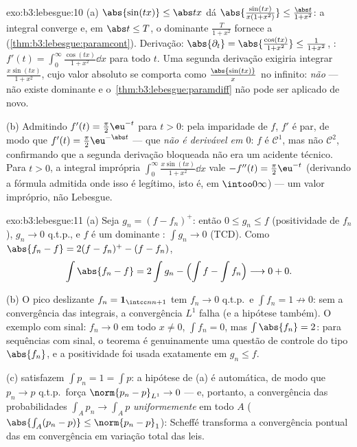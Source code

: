 \begin{solution}{exo:b3:lebesgue:10}
(a) $\abs{\sin(tx)} \leq \abs tx$ dá
$\abs{\frac{\sin(tx)}{x(1+x^2)}} \leq \frac{\abs
t}{1+x^2}$: a integral converge e, em $\abs t \leq T$, o
dominante $\frac{T}{1+x^2}$ fornece a 
(\cref{thm:b3:lebesgue:paramcont}). Derivação:
$\abs{\partial_t} = \abs{\frac{\cos(tx)}{1+x^2}} \leq
\frac1{1+x^2}$, : $f'(t) =
\int_0^\infty\frac{\cos(tx)}{1+x^2}\dd x$ para todo $t$. Uma segunda
derivação exigiria integrar $\frac{x\sin(tx)}{1 +
x^2}$, cujo valor absoluto se comporta como $\frac{\abs{\sin(tx)}}
x$ no infinito: \emph{não}  --- não existe dominante
e o~\cref{thm:b3:lebesgue:paramdiff} não pode ser aplicado de novo.

(b) Admitindo $f'(t) = \frac\pi2\eu^{-t}$ para $t > 0$: pela
imparidade de $f$, $f'$ é par, de modo que $f'(t) =
\frac\pi2\eu^{-\abs t}$ --- que \emph{não é derivável
em $0$}: $f$ é $\mathcal C^1$, mas não $\mathcal C^2$,
confirmando que a segunda derivação bloqueada não era um
acidente técnico. Para $t > 0$, a integral imprópria
$\int_0^\infty\frac{x\sin(tx)}{1+x^2}\dd x$ vale $-f''(t) =
\frac\pi2\eu^{-t}$ (derivando a fórmula admitida onde
isso é legítimo, isto é, em $\intoo0\infty$) --- um valor
impróprio, não Lebesgue.
\end{solution}

\begin{solution}{exo:b3:lebesgue:11}
(a) Seja $g_n = (f - f_n)^+$: então $0 \leq g_n \leq f$
(positividade de $f_n$), $g_n \to 0$ q.t.p., e $f$ é um
dominante : $\int g_n \to 0$ (TCD). Como
$\abs{f_n - f} = 2(f - f_n)^+ - (f - f_n)$,
\[
\int\abs{f_n - f} = 2\int g_n - \Bigl(\int f - \int
f_n\Bigr) \longrightarrow 0 + 0 .
\]

(b) O pico deslizante $f_n = \mathbf 1_{\intcc n{n+1}}$ tem
$f_n \to 0$ q.t.p.\ e $\int f_n = 1 \not\to 0$: sem a
convergência das integrais, a convergência $L^1$ falha (e a
hipótese também). O exemplo com sinal: $f_n \to 0$ em
todo $x \neq 0$, $\int f_n = 0$, mas $\int\abs{f_n} = 2$:
para sequências com sinal, o teorema é genuinamente uma questão de controle do tipo
$\abs{f_n}$, e a positividade foi usada exatamente em
$g_n \leq f$.

(c)  satisfazem $\int p_n = 1 = \int p$: a
hipótese de (a) é automática, de modo que $p_n \to p$ q.t.p.\ força
$\norm{p_n - p}_{L^1} \to 0$ --- e, portanto, a convergência
das probabilidades $\int_Ap_n \to \int_Ap$ \emph{uniformemente}
em todo  $A$ ($\abs{\int_A(p_n - p)} \leq
\norm{p_n - p}_1$): Scheffé transforma a convergência pontual das
 em convergência em variação total das leis.
\end{solution}

